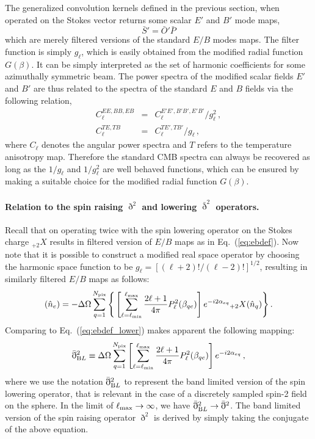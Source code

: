 \documentclass[a4paper,11pt]{article}
\newcommand{\beq}{\begin{equation}}
\newcommand{\eeq}{\end{equation}}
\newcommand{\beqry}{\begin{eqnarray}}
\newcommand{\eeqry}{\end{eqnarray}}
\def\eq#1{{Eq.~(\ref{#1})}}
\begin{document}
The generalized convolution kernels defined in the previous section, when operated on the Stokes vector returns some scalar $E'$ and $B'$ mode maps,
%
\beq
\bar{S}' = \bar{O}' \bar{P}
\eeq
%
which are merely filtered versions of the standard $E/B$ modes maps. The filter function is simply $g_{\ell}$, which is easily obtained from the modified radial function $G(\beta)$.  It can be simply interpreted as the set of harmonic coefficients for some azimuthally symmetric beam. The power spectra of the modified scalar fields $E'$ and $B'$ are thus related to the spectra of the standard $E$ and $B$ fields via the following relation, 
 \begin{subequations}
 \beqry
C_{\ell}^{EE,BB,EB} &= &C_{\ell}^{E'E',B'B',E'B'} /   g_{\ell}^2\,,\\
C_{\ell}^{TE,TB}  &=&  C_{\ell}^{TE',TB'} / g_{\ell}\,,
 \eeqry
 \end{subequations}
 where $C_{\ell}$ denotes the angular power spectra and $T$ refers to the temperature anisotropy map. Therefore the standard CMB spectra can always be recovered as long as the $1/g_{\ell}$ and $1/g_{\ell}^2$ are well behaved functions, which can be ensured by making a suitable choice for the modified radial function $G(\beta)$. 

\paragraph{Relation to the spin raising $\eth^2$ and lowering $\bar{\eth}^2$ operators.}
Recall that on operating twice with the spin lowering operator on the Stokes charge ${}_{+2}X$ results in filtered version of $E/B$ maps as in \eq{eq:ebdef}. Now note that it is possible to construct a modified real space operator by choosing the harmonic space function to be $g_{\ell} = [{(\ell+2)!/(\ell-2)!}]^{1/2}$, resulting in similarly filtered $E/B$ maps as follows:
%
\beq 
[\mathcal{E} + i \mathcal{B}](\hat{n}_e)=- \Delta \Omega\sum_{q=1}^{N_{\rm pix}} \Bigg\lbrace  \left[  \sum_{\ell=\ell_{\rm min}}^{\ell_{\rm max}} \frac{2 \ell+1}{4 \pi} P_{\ell}^2(\beta_{qe}) \right] e^{-i2\alpha_{eq}} {}_{+2}X(\hat{n}_{q}) \Bigg\rbrace \,. \label{eq:bl_ebdef_lower} 
\eeq
%
Comparing to \eq{eq:ebdef_lower} makes apparent the following mapping:
%
\beq
\bar{\eth}^2_{\textrm BL} \equiv \Delta \Omega \sum_{q=1}^{N_{\rm pix}} \left[ \sum_{\ell=\ell_{\rm min}}^{\ell_{\rm max}} \frac{2 \ell+1}{4 \pi} P_{\ell}^2(\beta_{qe}) \right] e^{-i2\alpha_{eq}}\,,
\eeq
%
where we use the notation $\bar{\eth}^2_{\textrm BL}$ to represent the band limited version of the spin lowering operator, that is relevant in the case of a discretely sampled spin-2 field on the sphere. In the limit of $\ell_{\rm max} \rightarrow \infty$, we have $\bar{\eth}^2_{\textrm BL} \rightarrow \bar{\eth}^2$.
The band limited version of the spin raising operator $\eth^2$ is derived by simply taking the conjugate of the above equation.
%
\end{document}
